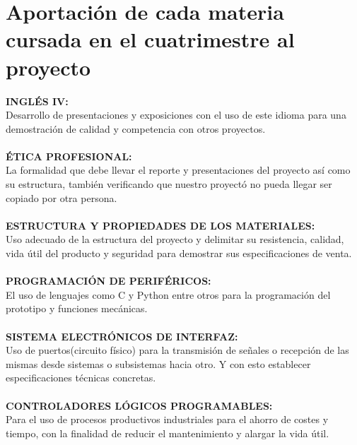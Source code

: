 \documentclass[11pt,a4paper]{article}
\begin{document}
\section{Aportación de cada materia cursada en el cuatrimestre al proyecto}
\textbf{INGLÉS IV:}\\ Desarrollo de presentaciones y exposiciones con el uso de este idioma para una demostración de calidad y competencia con otros proyectos.\\\\
\textbf{ÉTICA PROFESIONAL:}\\ La formalidad que debe llevar el reporte y presentaciones del proyecto así como su estructura, también verificando que nuestro proyectó no pueda llegar ser copiado por otra persona.\\\\
\textbf{ESTRUCTURA Y PROPIEDADES DE LOS MATERIALES:}\\ Uso adecuado de la estructura del proyecto y delimitar su resistencia, calidad, vida útil del producto y seguridad para demostrar sus especificaciones de venta.\\\\
\textbf{PROGRAMACIÓN DE PERIFÉRICOS:}\\ El uso de lenguajes como C y Python entre otros para la programación del prototipo y funciones mecánicas.\\\\
\textbf{SISTEMA ELECTRÓNICOS DE INTERFAZ:}\\ Uso de puertos(circuito físico) para la transmisión de señales o recepción de las mismas desde sistemas o subsistemas hacia otro. Y con esto establecer especificaciones técnicas concretas.\\\\
\textbf{CONTROLADORES LÓGICOS PROGRAMABLES:}\\ Para el uso de procesos productivos industriales para el ahorro de costes y tiempo, con la finalidad de reducir el mantenimiento y alargar la vida útil.
\pagebreak
\end{document}
